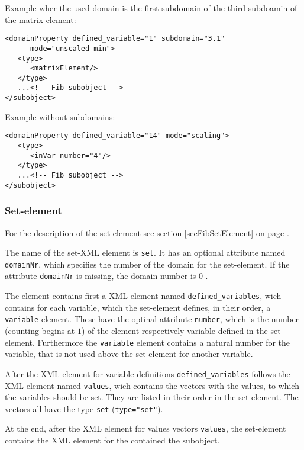 \noindent
Example wher the used domain is the first subdomain of the third subdoamin of the matrix element:
\begin{verbatim}
<domainProperty defined_variable="1" subdomain="3.1"
      mode="unscaled min">
   <type>
      <matrixElement/>
   </type>
   ...<!-- Fib subobject -->
</subobject>
\end{verbatim}

\noindent
Example without subdomains:
\begin{verbatim}
<domainProperty defined_variable="14" mode="scaling">
   <type>
      <inVar number="4"/>
   </type>
   ...<!-- Fib subobject -->
</subobject>
\end{verbatim}






\subsubsection{Set-element}

For the description of the set-element see section \ref{secFibSetElement} on page \pageref{secFibSetElement} .

The name of the set-XML element is \verb|set|. It has an optional attribute named \verb|domainNr|, which specifies the number of the domain for the set-element. If the attribute \verb|domainNr| is missing, the domain number is $0$ .

The element contains first a XML element named \verb|defined_variables|, wich contains for each variable, which the set-element defines, in their order, a \verb|variable| element.
These have the optinal attribute \verb|number|, which is the number (counting begins at $1$) of the element respectively variable defined in the set-element. Furthermore the \verb|variable| element contains a natural number for the variable, that is not used above the set-element for another variable.

After the XML element for variable definitions \verb|defined_variables| follows the XML element named \verb|values|, wich contains the vectors with the values, to which the variables should be set. They are listed in their order in the set-element. The vectors all have the type \verb|set| (\verb|type="set"|).

At the end, after the XML element for values vectors \verb|values|, the set-element contains the XML element for the contained the subobject.

